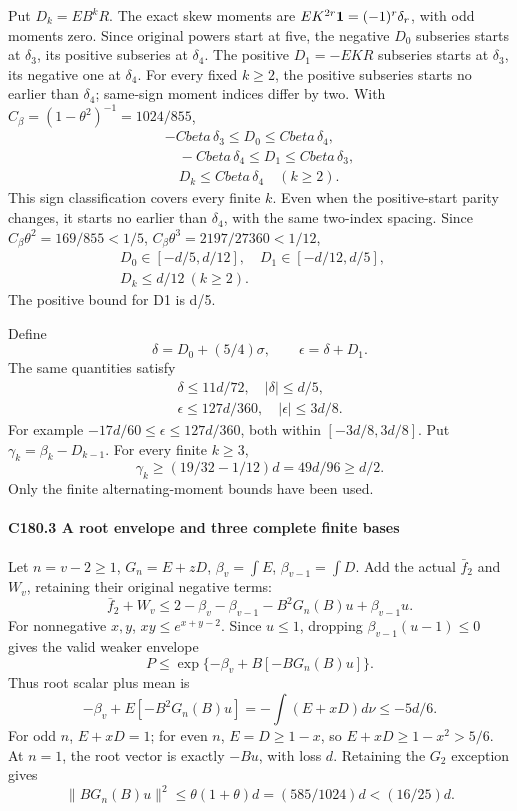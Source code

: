 Put \(D_k=EB^kR\). The exact skew moments are \(EK^{2r}\mathbf1=(-1)^r\delta_r\), with odd moments zero. Since original powers start at five, the negative \(D_0\) subseries starts at \(\delta_3\), its positive subseries at \(\delta_4\). The positive \(D_1=-EKR\) subseries starts at \(\delta_3\), its negative one at \(\delta_4\). For every fixed \(k\ge2\), the positive subseries starts no earlier than \(\delta_4\); same-sign moment indices differ by two. With \(C_\beta=(1-\theta^2)^{-1}=1024/855\),
\[
\begin{gathered}
-Cbeta\,\delta_3\le D_0\le Cbeta\,\delta_4,\\
\quad -Cbeta\,\delta_4\le D_1\le Cbeta\,\delta_3,\\
\quad D_k\le Cbeta\,\delta_4\quad(k\ge2).
\end{gathered}\tag{C180.14}
\]
This sign classification covers every finite \(k\). Even when the positive-start parity changes, it starts no earlier than \(\delta_4\), with the same two-index spacing. Since \(C_\beta\theta^2=169/855<1/5\), \(C_\beta\theta^3=2197/27360<1/12\),
\[
\begin{gathered}
D_0\in[-d/5,d/12],\quad D_1\in[-d/12,d/5],\quad\\
D_k\le d/12\ (k\ge2).
\end{gathered}\tag{C180.15}
\]
The positive bound for D1 is d/5.

Define
\[
 \delta=D_0+(5/4)\sigma,\qquad\epsilon=\delta+D_1.
\]
The same quantities satisfy
\[
\begin{gathered}
\delta\le11d/72,\quad |\delta|\le d/5,\quad\\
\epsilon\le127d/360,\quad|\epsilon|\le3d/8.
\end{gathered}\tag{C180.16}
\]
For example \(-17d/60\le\epsilon\le127d/360\), both within \([-3d/8,\allowbreak \allowbreak  3d/8]\). Put \(\gamma_k=\beta_k-D_{k-1}\). For every finite \(k\ge3\),
\[
 \gamma_k\ge(19/32-1/12)d=49d/96\ge d/2.              \tag{C180.17}
\]
Only the finite alternating-moment bounds have been used.

\paragraph{C180.3 A root envelope and three complete finite bases}

Let \(n=v-2\ge1\), \(G_n=E+zD\), \(\beta_v=\int E\), \(\beta_{v-1}=\int D\). Add the actual \(\bar f_2\) and \(W_v\), retaining their original negative terms:
\[
 \bar f_2+W_v\le2-\beta_v-\beta_{v-1}-B^2G_n(B)u+\beta_{v-1}u.
\]
For nonnegative \(x,\allowbreak \allowbreak  y\), \(xy\le e^{x+y-2}\). Since \(u\le1\), dropping \(\beta_{v-1}(u-1)\le0\) gives the valid weaker envelope
\[
 P\le\exp\{-\beta_v+B[-BG_n(B)u]\}.                  \tag{C180.18}
\]
Thus root scalar plus mean is
\[
 -\beta_v+E[-B^2G_n(B)u]=-\int(E+xD)d\nu\le-5d/6.   \tag{C180.19}
\]
For odd \(n\), \(E+xD=1\); for even \(n\), \(E=D\ge1-x\), so \(E+xD\ge1-x^2>5/6\). At \(n=1\), the root vector is exactly \(-Bu\), with loss \(d\). Retaining the \(G_2\) exception gives
\[
\|BG_n(B)u\|^2\le\theta(1+\theta)d=(585/1024)d<(16/25)d.\tag{C180.20}
\]

